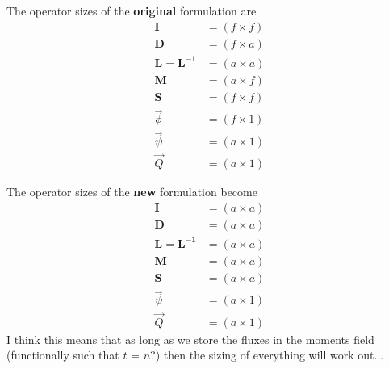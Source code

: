 \documentclass[12pt,twoside]{article}
\newcommand{\ve}[1]{\ensuremath{\mathbf{#1}}}
\begin{document}
The operator sizes of the \textbf{original} formulation are
\begin{align*}
\ve{I} &= (f \times f) \\
\ve{D} &= (f \times a) \\
\ve{L} = \ve{L^{-1}} &= (a \times a) \\
\ve{M} &= (a \times f) \\
\ve{S} &= (f \times f) \\
\vec{\phi} &= (f \times 1) \\
\vec{\psi} &= (a \times 1) \\
\vec{Q} &= (a \times 1)
\end{align*}

The operator sizes of the \textbf{new} formulation become
\begin{align*}
\ve{I} &= (a \times a) \\
\ve{D} &= (a \times a) \\
\ve{L} = \ve{L^{-1}} &= (a \times a) \\
\ve{M} &= (a \times a) \\
\ve{S} &= (a \times a) \\
\vec{\psi} &= (a \times 1) \\
\vec{Q} &= (a \times 1)
\end{align*}
I think this means that as long as we store the fluxes in the moments field (functionally such that $t$ = $n$?) then the sizing of everything will work out...
\end{document}
